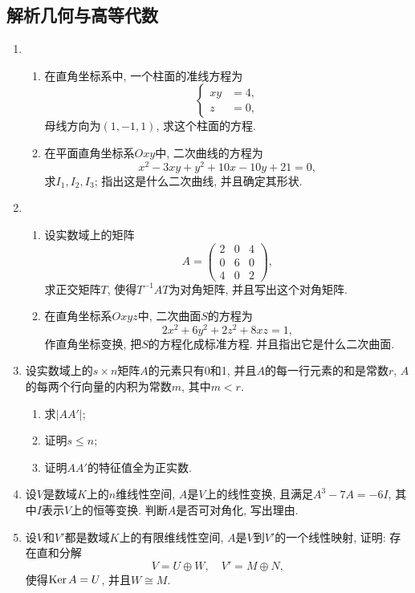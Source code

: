 \documentclass[12pt,a4paper,openany]{book}
\newcommand\Ker{\text{Ker\,}}
\begin{document}
\subsection{解析几何与高等代数}
\begin{enumerate}
\item 
\begin{enumerate}
\item 在直角坐标系中, 一个柱面的准线方程为
\[
\left\{
\begin{aligned}
xy &= 4, \\
z &= 0,
\end{aligned}
\right.
\]
母线方向为$(1, -1, 1)$, 求这个柱面的方程.

\item 在平面直角坐标系$Oxy$中, 二次曲线的方程为
\[
x^2 - 3xy + y^2 + 10x - 10y + 21 = 0,
\]
求$I_1, I_2, I_3$; 指出这是什么二次曲线, 并且确定其形状.
\end{enumerate}

\item 
\begin{enumerate}
\item 设实数域上的矩阵
\[
A = \begin{pmatrix}
2 & 0 & 4 \\
0 & 6 & 0 \\
4 & 0 & 2
\end{pmatrix},
\]
求正交矩阵$T$, 使得$T^{-1}AT$为对角矩阵, 并且写出这个对角矩阵.

\item 在直角坐标系$Oxyz$中, 二次曲面$S$的方程为
\[
2x^2 + 6y^2 + 2z^2 + 8xz = 1,
\]
作直角坐标变换, 把$S$的方程化成标准方程. 并且指出它是什么二次曲面.

\end{enumerate}

\item 设实数域上的$s \times n$矩阵$A$的元素只有0和1, 并且$A$的每一行元素的和是常数$r$, $A$的每两个行向量的内积为常数$m$, 其中$m < r$.
\begin{enumerate}
\item 求$|AA'|$;
\item 证明$s \le n$;
\item 证明$AA'$的特征值全为正实数.
\end{enumerate}

\item 设$V$是数域$K$上的$n$维线性空间, $A$是$V$上的线性变换, 且满足$A^3 - 7A = -6I$, 其中$I$表示$V$上的恒等变换. 判断$A$是否可对角化, 写出理由.

\item 设$V$和$V'$都是数域$K$上的有限维线性空间, $A$是$V$到$V'$的一个线性映射, 证明: 存在直和分解
\[
V = U \oplus W, \quad V' = M \oplus N,
\]
使得$\Ker{A} = U$, 并且$W \cong M$.


\end{enumerate}
\end{document}
